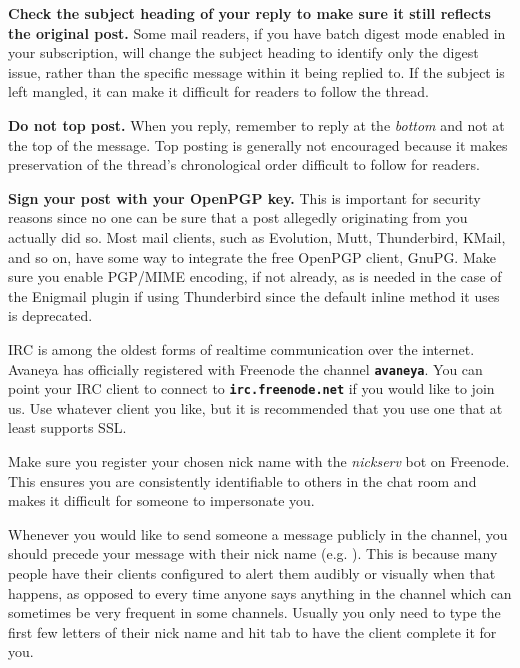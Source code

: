 \item
{\bf Check the subject heading of your reply to make sure it still reflects the original post.} Some mail readers, if you have batch digest mode enabled in your subscription, will change the subject heading to identify only the digest issue, rather than the specific message within it being replied to. If the subject is left mangled, it can make it difficult for readers to follow the thread.

\item
{\bf Do not top post.} When you reply, remember to reply at the {\it bottom} and not at the top of the message. Top posting is generally not encouraged because it makes preservation of the thread's chronological order difficult to follow for readers.

\item
{\bf Sign your post with your OpenPGP key.} This is important for security reasons since no one can be sure that a post allegedly originating from you actually did so. Most mail clients, such as Evolution, Mutt, Thunderbird, KMail, and so on, have some way to integrate the free OpenPGP client, GnuPG. Make sure you enable PGP/MIME encoding, if not already, as is needed in the case of the Enigmail plugin if using Thunderbird since the default inline method it uses is deprecated.
\stopitemize


IRC is among the oldest forms of realtime communication over the internet. Avaneya has officially registered with Freenode the channel {\bf \tt \type{#}avaneya}. You can point your IRC client to connect to {\bf \tt irc.freenode.net} if you would like to join us. Use whatever client you like, but it is recommended that you use one that at least supports SSL.

Make sure you register your chosen nick name with the {\it nickserv} bot on Freenode. This ensures you are consistently identifiable to others in the chat room and makes it difficult for someone to impersonate you.

Whenever you would like to send someone a message publicly in the channel, you should precede your message with their nick name (e.g. ). This is because many people have their clients configured to alert them audibly or visually when that happens, as opposed to every time anyone says anything in the channel which can sometimes be very frequent in some channels. Usually you only need to type the first few letters of their nick name and hit tab to have the client complete it for you.


